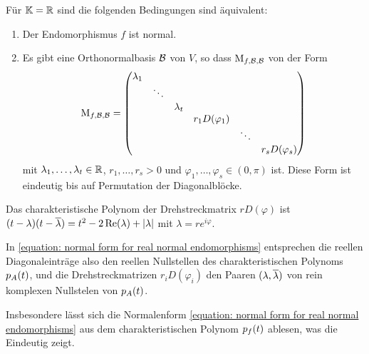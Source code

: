 \begin{theorem}
  Für $\mathbb{K} = \mathbb{R}$ sind die folgenden Bedingungen sind äquivalent:
  \begin{enumerate}
    \item
      Der Endomorphismus $f$ ist normal.
    \item
      Es gibt eine Orthonormalbasis $\mathcal{B}$ von $V$, so dass $\operatorname{M}_{f, \mathcal{B}, \mathcal{B}}$ von der Form
      \begin{equation}
      \label{equation: normal form for real normal endomorphisms}
          \operatorname{M}_{f, \mathcal{B}, \mathcal{B}}
        = \begin{pmatrix}
            \lambda_1 &         &           &                   &         &                   \\
                      & \ddots  &           &                   &         &                   \\
                      &         & \lambda_t &                   &         &                   \\
                      &         &           & r_1 D(\varphi_1)  &         &                   \\
                      &         &           &                   & \ddots  &                   \\
                      &         &           &                   &         & r_s D(\varphi_s)
          \end{pmatrix}
      \end{equation}
      mit $\lambda_1, \dotsc, \lambda_t \in \mathbb{R}$, $r_1, \dotsc, r_s > 0$ und $\varphi_1, \dotsc, \varphi_s \in (0, \pi)$ ist.
      Diese Form ist eindeutig bis auf Permutation der Diagonalblöcke.
  \end{enumerate}
\end{theorem}

\begin{remark}
  Das charakteristische Polynom der Drehstreckmatrix $r D(\varphi)$ ist $(t - \lambda)(t - \overline{\lambda}) = t^2 - 2\operatorname{Re}(\lambda) + \left| \lambda \right|$ mit $\lambda = r e^{i \varphi}$.
  
  In \eqref{equation: normal form for real normal endomorphisms} entsprechen die reellen Diagonaleinträge also den reellen Nullstellen des charakteristischen Polynoms $p_{A}(t)$, und die Drehstreckmatrizen $r_i D(\varphi_i)$ den Paaren $(\lambda, \overline{\lambda})$ von rein komplexen Nullstelen von $p_{A}(t)$.
  
  Insbesondere lässt sich die Normalenform \eqref{equation: normal form for real normal endomorphisms} aus dem charakteristischen Polynom $p_{f}(t)$ ablesen, was die Eindeutig zeigt.
\end{remark}

